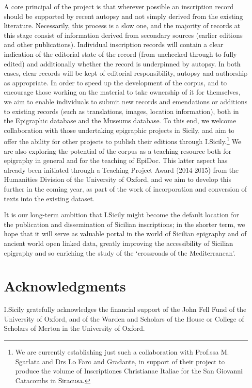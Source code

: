 \documentclass[amsthm,ebook]{saparticle}
\begin{document}
A core principal of the project is that wherever possible an inscription record should be supported by recent autopsy
and not simply derived from the existing literature. Necessarily, this process is a slow one, and the majority of
records at this stage consist of information derived from secondary sources (earlier editions and other publications).
Individual inscription records will contain a clear indication of the editorial state of the record (from unchecked
through to fully edited) and additionally whether the record is underpinned by autopsy. In both cases, clear records
will be kept of editorial responsibility, autopsy and authorship as appropriate. In order to speed up the development
of the corpus, and to encourage those working on the material to take ownership of it for themselves, we aim to enable
individuals to submit new records and emendations or additions to existing records (such as translations, images,
location information), both in the Epigraphic database and the Museums database. To this end, we welcome collaboration
with those undertaking epigraphic projects in Sicily, and aim to offer the ability for other projects to publish their
editions through I.Sicily.\footnote{ We are currently establishing just such a collaboration with Prof.ssa M. Sgarlata
and Drs Lo Faro and Gradante, in support of their project to produce the volume of Inscriptiones Christianae Italiae
for the San Giovanni Catacombs in Siracusa.} We are also exploring the potential of the corpus as a teaching resource
both for epigraphy in general and for the teaching of EpiDoc. This latter aspect has already been initiated through a
Teaching Project Award (2014-2015) from the Humanities Division of the University of Oxford, and we aim to develop this
further in the coming year, as part of the work of incorporation and conversion of texts into the existing dataset.

It is our long-term ambition that I.Sicily might become the default location for the publication and dissemination of
Sicilian inscriptions; in the shorter term, we hope that it will serve as valuable portal in the world of Sicilian
epigraphy and of ancient world open linked data, greatly improving the accessibility of Sicilian epigraphy and so
enriching the study of the `crossroads of the Mediterranean’.




\section*{Acknowledgments}

\noindent I.Sicily gratefully acknowledges the financial support of the John Fell Fund of the
University of Oxford, and of the Warden and Scholars of the House or College of Scholars of Merton in the University of
Oxford.




\end{document}
